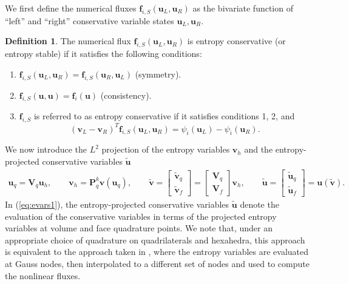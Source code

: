 \documentclass[10pt]{amsart}
\theoremstyle{definition}
\newtheorem{definition}{Definition}
\theoremstyle{lemma}
\theoremstyle{theorem}
\theoremstyle{assumption}
\renewcommand{\tilde}{\widetilde}
\newcommand{\LRp}[1]{\left( #1 \right)}
\newcommand{\LRs}[1]{\left[ #1 \right]}
\begin{document}
{We first define the numerical fluxes $\bm{f}_{i,S}\LRp{\bm{u}_L,\bm{u}_R}$ as the bivariate function of ``left'' and ``right'' conservative variable states $\bm{u}_L, \bm{u}_R$.  %
\begin{definition}
The numerical flux $\bm{f}_{i,S}\LRp{\bm{u}_L,\bm{u}_R}$ is entropy conservative (or entropy stable) if it satisfies the following conditions:
\begin{enumerate}
\item $\bm{f}_{i,S}\LRp{\bm{u}_L,\bm{u}_R} = \bm{f}_{i,S}\LRp{\bm{u}_R,\bm{u}_L}$ (symmetry).
\item $\bm{f}_{i,S}\LRp{\bm{u},\bm{u}} = \bm{f}_i\LRp{\bm{u}}$ (consistency).
\item $\bm{f}_{i,S}$ is referred to as entropy conservative if it satisfies conditions 1, 2, and  
\[
  \LRp{\bm{v}_L-\bm{v}_R}^T\bm{f}_{i,S}\LRp{\bm{u}_L,\bm{u}_R} = \psi_i\LRp{\bm{u}_L}-\psi_i\LRp{\bm{u}_R}.
\]
\end{enumerate}
\label{def:entropyflux}
\end{definition}

We now introduce the $L^2$ projection of the entropy variables $\bm{v}_h$ and the entropy-projected conservative variables $\tilde{\bm{u}}$ 
\begin{align}
\bm{u}_q = \bm{V}_q \bm{u}_h, \qquad \bm{v}_h = \bm{P}^k_q \bm{v}\LRp{\bm{u}_q}, \qquad 
\tilde{\bm{v}} = \LRs{\begin{array}{c}
\tilde{\bm{v}}_q\\
\tilde{\bm{v}}_f
\end{array}} = \LRs{\begin{array}{c}
\bm{V}_q\\
\bm{V}_f
\end{array}}\bm{v}_h, \qquad \tilde{\bm{u}} = \LRs{\begin{array}{c}
\tilde{\bm{u}}_q\\
\tilde{\bm{u}}_f
\end{array}} = \bm{u}\LRp{\tilde{\bm{v}}}.
\label{eq:evars1}
\end{align}
In (\ref{eq:evars1}), the entropy-projected conservative variables $\tilde{\bm{u}}$ denote the evaluation of the conservative variables in terms of the projected entropy variables at volume and face quadrature points.  We note that, under an appropriate choice of quadrature on quadrilaterals and hexahedra, this approach is equivalent to the approach taken in \cite{parsani2016entropy}, where the entropy variables are evaluated at Gauss nodes, then interpolated to a different set of nodes and used to compute the nonlinear fluxes.  

}
\end{document}
